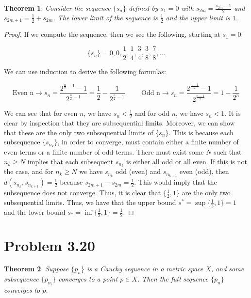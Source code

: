 \documentclass[psamsfonts]{amsart}
\newtheorem{thm}{Theorem}[section]
\theoremstyle{definition}
\theoremstyle{remark}
\numberwithin{equation}{section}
\begin{document}
\begin{thm}
Consider the sequence $\{ s_n \}$ defined by $s_1 = 0$ with $s_{2m} = \frac{s_{2m} - 1}{2}$ and $s_{2m+1} = \frac{1}{2} + s_{2m}$. The lower limit of the sequence is $\frac{1}{2}$ and the upper limit is $1$. 
\end{thm}

\begin{proof}
If we compute the sequence, then we see the following, starting at $s_1 = 0$:

\begin{equation}
\{ s_n \} = 0, 0, \frac{1}{2}, \frac{1}{4}, \frac{3}{4}, \frac{3}{8}, \frac{7}{8}, \ldots
\end{equation}

We can use induction to derive the following formulas:

\begin{equation*}
\text{Even n} \rightarrow s_n = \frac{2^{\frac{n}{2}-1} - 1 }{2^{\frac{n}{2} -1}} = \frac{1}{2} - \frac{1}{2^{\frac{n}{2}-1}} \hspace{1cm} \text{Odd n} \rightarrow s_n = \frac{2^{\frac{n-1}{2}} - 1}{2^{\frac{n-1}{2}}} = 1 - \frac{1}{2^n}
\end{equation*}

We can see that for even $n$, we have $s_n < \frac{1}{2}$ and for odd $n$, we have $s_n < 1$. It is clear by inspection that they are subsequential limits. Moreover, we can show that these are the only two subsequential limits of $\{ s_{n} \}$. This is because each subsequence $\{ s_{n_k} \}$, in order to converge, must contain either a finite number of even terms or a finite number of odd terms. There must exist some $N$ such that $n_k \geq N$ implies that each subsequent $s_{n_k}$ is either all odd or all even. If this is not the case, and for $n_k \geq N$ we have $s_{n_k}$ odd (even) and $s_{n_{k+1}}$ even (odd), then $d(s_{n_k},s_{n_{k+1}}) = \frac{1}{2}$ because $s_{2m+1} - s_{2m} = \frac{1}{2}$. This would imply that the subsequence does not converge. Thus, it is clear that $\{\frac{1}{2},1 \}$ are the only two subsequential limits. Thus, we have that the upper bound $s^{*} = \sup \{ \frac{1}{2}, 1 \} = 1$ and the lower bound $s_{*} = \inf \{ \frac{1}{2},1 \} = \frac{1}{2}$. 

\end{proof}

\section{Problem 3.20}
\begin{thm}
Suppose $\{ p_n \}$ is a Cauchy sequence in a metric space $X$, and some subsequence $\{ p_{n_i} \}$ converges to a point $p \in X$. Then the full sequence $\{ p_n \}$ converges to $p$. 
\end{thm}
\end{document}
